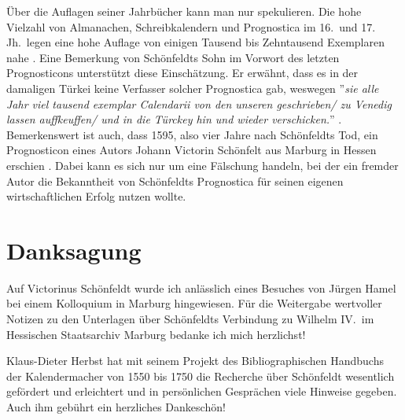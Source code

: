 \documentclass[12pt]{article}
\begin{document}
Über die Auflagen seiner Jahrbücher kann man nur spekulieren. Die hohe Vielzahl von Almanachen, Schreibkalendern und Prognostica im 16.\ und 17. Jh.\ legen eine hohe Auflage von einigen Tausend bis Zehntausend Exemplaren nahe \cite{Herbst2016}. Eine Bemerkung von Schönfeldts Sohn im Vorwort des letzten Prognosticons unterstützt diese Einschätzung. Er erwähnt, dass es in der damaligen Türkei keine Verfasser solcher Prognostica gab, weswegen ''\emph{sie alle Jahr viel tausend exemplar Calendarii von den unseren geschrieben/ zu Venedig lassen auffkeuffen/ und in die Türckey hin und wieder verschicken.}'' \cite{Schoenfeldt1591a}. Bemerkenswert ist auch, dass 1595, also vier Jahre nach Schönfeldts Tod, ein Prognosticon eines Autors Johann Victorin Schönfelt aus Marburg in Hessen erschien \cite{Herbst}. Dabei kann es sich nur um eine Fälschung handeln, bei der ein fremder Autor die Bekanntheit von Schönfeldts Prognostica für seinen eigenen wirtschaftlichen Erfolg nutzen wollte.


\section*{Danksagung}

Auf Victorinus Schönfeldt wurde ich anlässlich eines Besuches von Jürgen Hamel bei einem Kolloquium in Marburg hingewiesen. Für die Weitergabe wertvoller Notizen zu den Unterlagen über Schönfeldts Verbindung zu Wilhelm IV.\ im Hessischen Staatsarchiv Marburg bedanke ich mich herzlichst!

Klaus-Dieter Herbst hat mit seinem Projekt des Bibliographischen Handbuchs der Kalendermacher von 1550 bis 1750 die Recherche über Schönfeldt wesentlich gefördert und erleichtert und in persönlichen Gesprächen viele Hinweise gegeben. Auch ihm gebührt ein herzliches Dankeschön!


%

\end{document}
